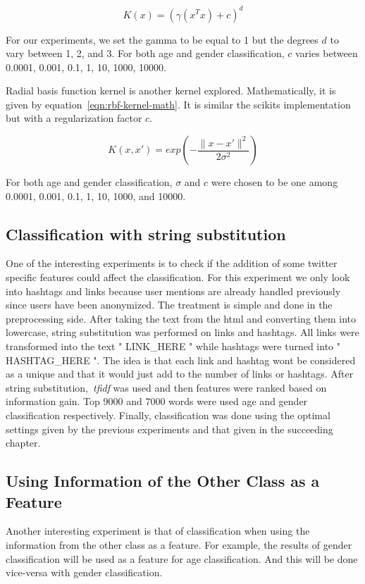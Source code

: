 \documentclass[a4paper]{llncs}
\begin{document}
\begin{equation}
K(x) = (\gamma(x^Tx)+c)^d
\label{eqn:poly-kernel-scikit}
\end{equation}

For our experiments, we set the gamma to be equal to 1 but the degrees $d$ to vary between 1, 2, and 3. For both age and gender classification, $c$ varies between 0.0001, 0.001, 0.1, 1, 10, 1000, 10000.   

Radial basis function kernel is another kernel explored. Mathematically, it is given by equation~\ref{eqn:rbf-kernel-math}. It is similar the scikits implementation but with a regularization factor $c$. 

\begin{equation}
K(x,x')= exp\left( -\frac{\parallel x-x'\parallel^2}{2\sigma^2} \right)
\label{eqn:rbf-kernel-math}
\end{equation} 

For both age and gender classification, $\sigma$ and $c$ were chosen to be one among 0.0001, 0.001, 0.1, 1, 10, 1000, and 10000.

\subsection{Classification with string substitution}
One of the interesting experiments is to check if the addition of some twitter specific features could affect the classification. For this experiment we only look into hashtags and links because user mentions are already handled previously since users have been anonymized. The treatment is simple and done in the preprocessing side. After taking the text from the html and converting them into lowercase, string substitution was performed on links and hashtags. All links were transformed into the text " LINK\_HERE " while hashtags were turned into " HASHTAG\_HERE ". The idea is that each link and hashtag wont be considered as a unique and that it would just add to the number of links or hashtags. After string substitution,~\textit{tfidf} was used and then features were ranked based on information gain. Top 9000 and 7000 words were used age and gender classification respectively. Finally, classification was done using the optimal settings given by the previous experiments and that given in the succeeding chapter. 


\subsection{Using Information of the Other Class as a Feature}
Another interesting experiment is that of classification when using the information from the other class as a feature. For example, the results of gender classification will be used as a feature for age classification. And this will be done vice-versa with gender classification.  
\end{document}
